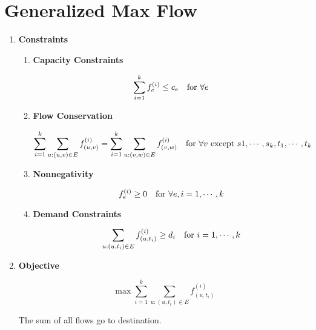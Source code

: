 \documentclass[11pt]{article}
\newenvironment{qparts}{\begin{enumerate}[{(}a{)}]}{\end{enumerate}}
\begin{document}
\newpage
\section{Generalized Max Flow}
\begin{qparts}
	\item \textbf{Constraints}
	
	\renewcommand{\theenumii}{\roman{enumii}}
	\begin{enumerate}
		\item \textbf{Capacity Constraints}
		
		\[
			\sum_{i=1}^{k} f_e^{(i)} \le c_e \text{\quad for } \forall e
		\]
		
		\item \textbf{Flow Conservation}
		
		\[
			\sum_{i=1}^{k} \sum_{u:(u, v)\in E} f_{(u, v)}^{(i)}  = \sum_{i=1}^{k} \sum_{u:(v, w)\in E} f_{(v, w)}^{(i)} \text{\quad for } \forall v \text{ except }s1, \cdots, s_k, t_1, \cdots, t_k
		\]
		
		\item \textbf{Nonnegativity}
		
		\[
			 f_e^{(i)} \ge 0 \text{\quad for } \forall e, i = 1, \cdots, k
		\]
		
		\item \textbf{Demand Constraints}
		
		\[
			\sum_{u:(u, t_i)\in E} f_{(u, t_i)}^{(i)} \ge d_i \text{\quad for }  i = 1, \cdots, k
		\]
		
	\end{enumerate}


	\item \textbf{Objective}
	
	\[
		\max \sum_{i=1}^{k}\sum_{u:(u, t_i)\in E} f_{(u, t_i)}^{(i)}
	\]
	
	The sum of all flows go to destination.


\end{qparts}

\newpage
\end{document}
